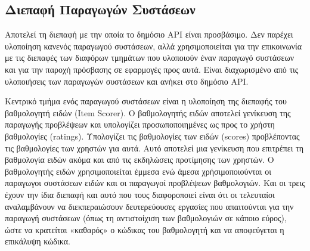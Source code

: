 \subsection{Διεπαφή Παραγωγών Συστάσεων}
Αποτελεί τη διεπαφή με την οποία το δημόσιο ΑΡΙ είναι προσβάσιμο. Δεν παρέχει υλοποίηση κανενός παραγωγού συστάσεων, αλλά χρησιμοποιείται για την επικοινωνία με τις διεπαφές των διαφόρων τμημάτων που υλοποιούν έναν παραγωγό συστάσεων και για την παροχή πρόσβασης σε εφαρμογές προς αυτά. Είναι διαχωρισμένο από τις υλοποιήσεις των παραγωγών συστάσεων και ανήκει στο δημόσιο ΑΡΙ. \par 
Κεντρικό τμήμα ενός παραγωγού συστάσεων είναι η υλοποίηση της διεπαφής του βαθμολογητή ειδών ({\en Item Scorer}). Ο βαθμολογητής ειδών αποτελεί  γενίκευση της παραγωγής προβλέψεων και υπολογίζει προσωποποιημένες ως προς το χρήστη βαθμολογίες ({\en ratings}). Υπολογίζει τις βαθμολογίες των ειδών ({\en scores}) προβλέποντας τις βαθμολογίες των χρηστών για αυτά. Αυτό αποτελεί μια γενίκευση που επιτρέπει τη βαθμολογία ειδών ακόμα και από τις εκδηλώσεις προτίμησης των χρηστών. Ο βαθμολογητής ειδών χρησιμοποιείται έμμεσα ενώ άμεσα χρήσιμοποιούνται οι παραγωγοι συστάσεων ειδών και οι παραγωγοί προβλέψεων βαθμολογιών. Και οι τρεις έχουν την ίδια διεπαφή και αυτό που τους διαφοροποιεί είναι ότι οι τελευταίοι αναλαμβάνουν να διεκπεραιώσουν δευτερεύουσες εργασίες που απαιτούνται για την παραγωγή συστάσεων (όπως τη αντιστοίχιση των βαθμολογιών σε κάποιο εύρος), ώστε να κρατείται «καθαρός» ο κώδικας του βαθμολογητή και να αποφεύγεται η επικάλυψη κώδικα. 
